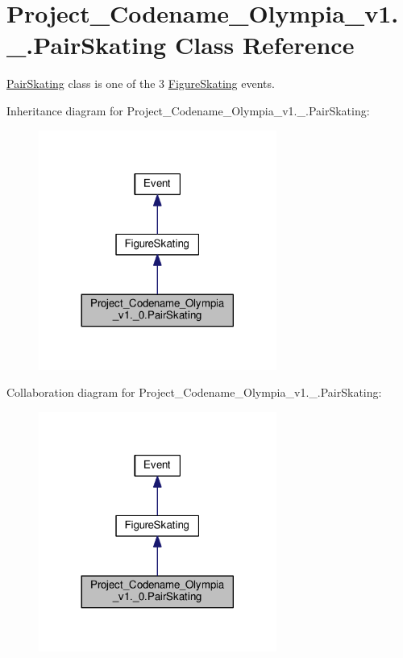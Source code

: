 \hypertarget{classProject__Codename__Olympia__v1_1_1__0_1_1PairSkating}{}\section{Project\+\_\+\+Codename\+\_\+\+Olympia\+\_\+v1.\+\_.\+Pair\+Skating Class Reference}
\label{classProject__Codename__Olympia__v1_1_1__0_1_1PairSkating}


\hyperlink{classProject__Codename__Olympia__v1_1_1__0_1_1PairSkating}{Pair\+Skating} class is one of the 3 \hyperlink{classProject__Codename__Olympia__v1_1_1__0_1_1FigureSkating}{Figure\+Skating} events.  




Inheritance diagram for Project\+\_\+\+Codename\+\_\+\+Olympia\+\_\+v1.\+\_.\+Pair\+Skating\+:
\nopagebreak
\begin{figure}[H]
\begin{center}
\leavevmode
\includegraphics[width=221pt]{classProject__Codename__Olympia__v1_1_1__0_1_1PairSkating__inherit__graph}
\end{center}
\end{figure}


Collaboration diagram for Project\+\_\+\+Codename\+\_\+\+Olympia\+\_\+v1.\+\_.\+Pair\+Skating\+:
\nopagebreak
\begin{figure}[H]
\begin{center}
\leavevmode
\includegraphics[width=221pt]{classProject__Codename__Olympia__v1_1_1__0_1_1PairSkating__coll__graph}
\end{center}
\end{figure}
